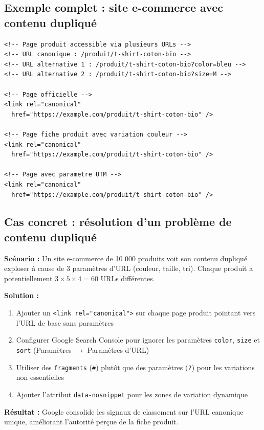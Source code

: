 \documentclass[12pt,a4paper,twoside]{report}
\begin{document}
\subsection{Exemple complet : site e-commerce avec contenu dupliqué}

\begin{lstlisting}[style=htmlcode,caption={Structure canonical complète pour un site e-commerce}]
<!-- Page produit accessible via plusieurs URLs -->
<!-- URL canonique : /produit/t-shirt-coton-bio -->
<!-- URL alternative 1 : /produit/t-shirt-coton-bio?color=bleu -->
<!-- URL alternative 2 : /produit/t-shirt-coton-bio?size=M -->

<!-- Page officielle -->
<link rel="canonical"
  href="https://example.com/produit/t-shirt-coton-bio" />

<!-- Page fiche produit avec variation couleur -->
<link rel="canonical"
  href="https://example.com/produit/t-shirt-coton-bio" />

<!-- Page avec parametre UTM -->
<link rel="canonical"
  href="https://example.com/produit/t-shirt-coton-bio" />
\end{lstlisting}

\subsection{Cas concret : résolution d'un problème de contenu dupliqué}

\textbf{Scénario :} Un site e-commerce de 10 000 produits voit son contenu dupliqué exploser à cause de 3 paramètres d'URL (couleur, taille, tri). Chaque produit a potentiellement $3 \times 5 \times 4 = 60$ URLs différentes.

\textbf{Solution :}
\begin{enumerate}
    \item Ajouter un \texttt{<link rel="canonical">} sur chaque page produit pointant vers l'URL de base sans paramètres
    \item Configurer Google Search Console pour ignorer les paramètres \texttt{color}, \texttt{size} et \texttt{sort} (Paramètres $\rightarrow$ Paramètres d'URL)
    \item Utiliser des \texttt{fragments} (\texttt{\#}) plutôt que des paramètres (\texttt{?}) pour les variations non essentielles
    \item Ajouter l'attribut \texttt{data-nosnippet} pour les zones de variation dynamique
\end{enumerate}

\textbf{Résultat :} Google consolide les signaux de classement sur l'URL canonique unique, améliorant l'autorité perçue de la fiche produit.
\end{document}
